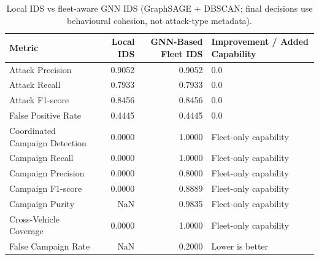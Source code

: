 \begin{table}[t]
\centering
\begin{tabular}{lrrl}
\toprule
Metric & Local IDS & GNN-Based Fleet IDS & Improvement / Added Capability \\
\midrule
Attack Precision & 0.9052 & 0.9052 & 0.0 \\
Attack Recall & 0.7933 & 0.7933 & 0.0 \\
Attack F1-score & 0.8456 & 0.8456 & 0.0 \\
False Positive Rate & 0.4445 & 0.4445 & 0.0 \\
Coordinated Campaign Detection & 0.0000 & 1.0000 & Fleet-only capability \\
Campaign Recall & 0.0000 & 1.0000 & Fleet-only capability \\
Campaign Precision & 0.0000 & 0.8000 & Fleet-only capability \\
Campaign F1-score & 0.0000 & 0.8889 & Fleet-only capability \\
Campaign Purity & NaN & 0.9835 & Fleet-only capability \\
Cross-Vehicle Coverage & 0.0000 & 1.0000 & Fleet-only capability \\
False Campaign Rate & NaN & 0.2000 & Lower is better \\
\bottomrule
\end{tabular}
\caption{Local IDS vs fleet-aware GNN IDS (GraphSAGE + DBSCAN; final decisions use behavioural cohesion, not attack-type metadata).}
\label{tab:local-vs-gnn-fleet}
\end{table}

